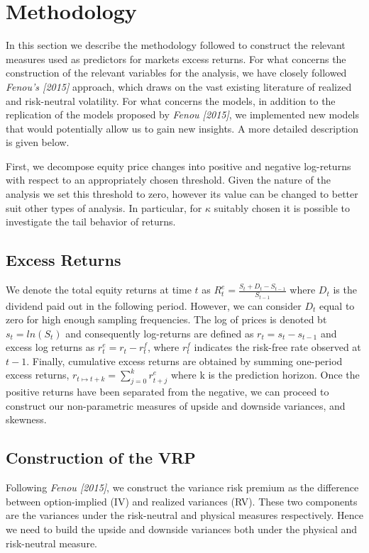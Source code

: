 
\section{Methodology}\label{sec:chapter2}
In this section we describe the methodology followed to construct the relevant measures used as predictors for markets excess returns.  For what concerns the construction of the relevant variables for the analysis, we have closely followed \textit{Fenou's [2015]} approach, which draws on the vast existing literature of realized and risk-neutral volatility. For what concerns the models, in addition to the replication of the models proposed by \textit{Fenou [2015]}, we implemented new models that would potentially allow us to gain new insights. A more detailed description is given below. 

First, we decompose equity price changes into positive and negative log-returns with respect to an appropriately chosen threshold. Given the nature of the analysis we set this threshold to zero, however its value can be changed to better suit other types of analysis. In particular, for $\kappa$ suitably chosen it is possible to investigate the tail behavior of returns. 

\subsection{Excess Returns}
\vspace{4mm}
We denote the total equity returns at time $t$ as $R_t^e=\frac{S_t+D_t-S_{t-1}}{S_{t-1}}$ where $D_t$ is the dividend paid out in the following period. However, we can consider $D_t$ equal to zero for high enough sampling frequencies. The log of prices is denoted bt $s_t=ln(S_t)$ and consequently log-returns are defined as $r_t=s_t-s_{t-1}$ and excess log returns as $r_t^e=r_t-r_t^f$, where $r_t^f$ indicates the risk-free rate observed at $t-1$. Finally, cumulative excess returns are obtained by summing one-period excess returns, $r_{t \mapsto t+k}=\sum_{j=0}^k r_{t+j}^e$ where k is the prediction horizon. Once the positive returns have been separated from the negative, we can proceed to construct our non-parametric measures of upside and downside variances, and skewness. 

\subsection{Construction of the VRP}
Following \textit{Fenou [2015]},  we construct the variance risk premium as the difference between option-implied (IV) and realized variances (RV). These two components are the variances under the risk-neutral and physical measures respectively. Hence we need to build the upside and downside variances both under the physical and risk-neutral measure. 

